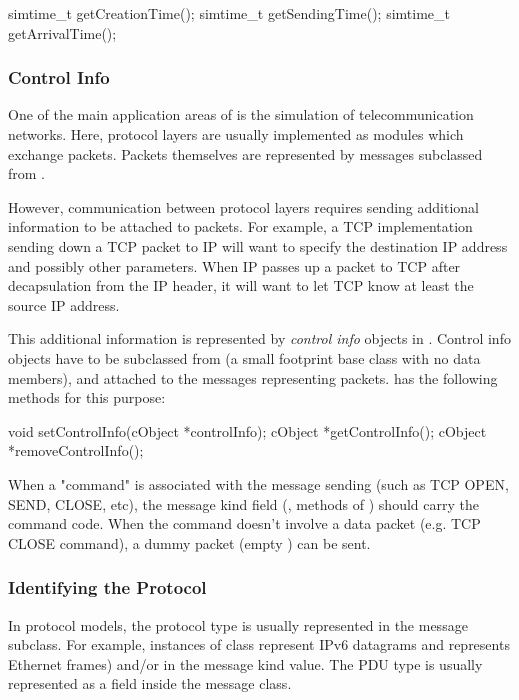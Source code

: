 \begin{cpp}
simtime_t getCreationTime();
simtime_t getSendingTime();
simtime_t getArrivalTime();
\end{cpp}

\subsubsection{Control Info}

One of the main application areas of {\opp} is the simulation of
telecommunication networks. Here, protocol layers are usually
implemented as modules which exchange packets. Packets themselves
are represented by messages subclassed from .

However, communication between protocol layers requires sending
additional information to be attached to packets. For example,
a TCP implementation sending down a TCP packet to IP will want
to specify the destination IP address and possibly
other parameters. When IP passes up a packet to TCP after
decapsulation from the IP header, it will want to let TCP know
at least the source IP address.

This additional information is represented by \textit{control info}
objects in {\opp}. Control info objects have to be subclassed from
 (a small footprint base class with
no data members), and attached to the messages representing
packets.  has the following methods for this
purpose:

\begin{cpp}
void setControlInfo(cObject *controlInfo);
cObject *getControlInfo();
cObject *removeControlInfo();
\end{cpp}

When a "command" is associated with the message sending (such as
TCP OPEN, SEND, CLOSE, etc), the message kind field (,
 methods of ) should carry the command code.
When the command doesn't involve a data packet (e.g.
TCP CLOSE command), a dummy packet (empty ) can be sent.



\subsubsection{Identifying the Protocol}

In {\opp} protocol models, the protocol type is usually represented
in the message subclass. For example, instances of class
 represent IPv6 datagrams and 
represents Ethernet frames) and/or in the message kind value.
The PDU type is usually represented as a field inside the message class.


